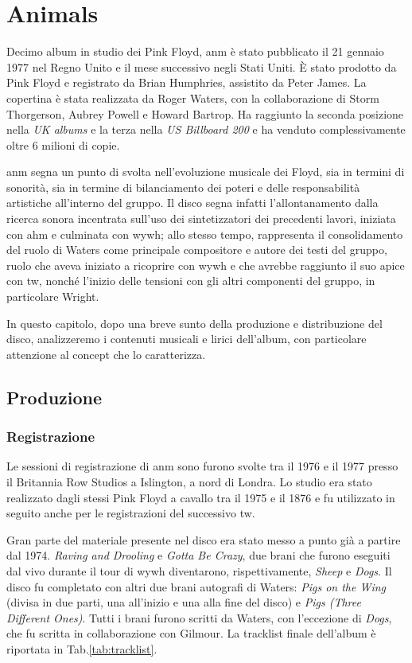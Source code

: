 \documentclass[class=book, crop=false, oneside, 12pt]{standalone}
\begin{document}
    \chapter{Animals}
    Decimo album in studio dei Pink Floyd, \acrfull{anm} è stato pubblicato il 21 gennaio 1977 nel Regno Unito e il mese successivo negli Stati Uniti. È stato prodotto da Pink Floyd e registrato da Brian Humphries, assistito da Peter James. La copertina è stata realizzata da Roger Waters, con la collaborazione di Storm Thorgerson, Aubrey Powell e Howard Bartrop. Ha raggiunto la seconda posizione nella \emph{UK albums} e la terza nella \emph{US Billboard 200} e ha venduto complessivamente oltre 6 milioni di copie.

    \acrshort{anm} segna un punto di svolta nell'evoluzione musicale dei Floyd, sia in termini di sonorità, sia in termine di bilanciamento dei poteri e delle responsabilità artistiche all'interno del gruppo. Il disco segna infatti l'allontanamento dalla ricerca sonora incentrata sull'uso dei sintetizzatori dei precedenti lavori, iniziata con \acrfull{ahm} e culminata con \acrshort {wywh}; allo stesso tempo, rappresenta il consolidamento del ruolo di Waters come principale compositore e autore dei testi del gruppo, ruolo che aveva iniziato a ricoprire con \acrshort{wywh} e che avrebbe raggiunto il suo apice con \acrlong{tw}, nonché l'inizio delle tensioni con gli altri componenti del gruppo, in particolare Wright.

    In questo capitolo, dopo una breve sunto della produzione e distribuzione del disco, analizzeremo i contenuti musicali e lirici dell'album, con particolare attenzione al concept che lo caratterizza.

    \section{Produzione}
    \subsection{Registrazione}
    Le sessioni di registrazione di \acrshort{anm} sono furono svolte tra il 1976 e il 1977 presso il Britannia Row Studios a Islington, a nord di Londra. Lo studio era stato realizzato dagli stessi Pink Floyd a cavallo tra il 1975 e il 1876 e fu utilizzato in seguito anche per le registrazioni del successivo \acrlong{tw}. 

    Gran parte del materiale presente nel disco era stato messo a punto già a partire dal 1974.  \emph{Raving and Drooling} e \emph{Gotta Be Crazy}, due brani che furono eseguiti dal vivo durante il tour di \acrshort{wywh} diventarono, rispettivamente, \emph{Sheep} e \emph{Dogs}. Il disco fu completato con altri due brani autografi di Waters: \emph{Pigs on the Wing} (divisa in due parti, una all'inizio e una alla fine del disco) e \emph{Pigs (Three Different Ones)}. Tutti i brani furono scritti da Waters, con l'eccezione di \emph{Dogs}, che fu scritta in collaborazione con Gilmour. La tracklist finale dell'album è riportata in Tab.\ref{tab:tracklist}.
\end{document}
